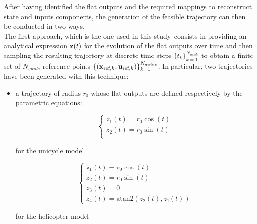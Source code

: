 \documentclass[../main.tex]{subfiles}
\begin{document}
After having identified the flat outputs and the required mappings to
reconstruct state and inputs components, the
generation of the feasible trajectory can then be conducted in two ways.\\

\pagebreak
The first approach, which is the one used in this study, consists in providing
an analytical expression $\mathbf{z}(t)$ for the evolution of the flat outputs over time and
then sampling  the resulting trajectory at discrete time steps
$\{t_k\}_{k=1}^{N_{guide}}$	to obtain a finite set of $N_{guide}$ reference
points $\{(\mathbf{x}_{\text{ref}, k}, \mathbf{u}_{\text{ref}, k})\}_{k=1}^{N_{guide}}$.
In particular, two trajectories have been generated with this technique:
\begin{itemize}
	
	\item a  trajectory of radius $r_0$ whose flat
		outputs are defined respectively by the parametric equations:
		\vspace{-0.5cm}
		\begin{multicols}{2}
			\begin{equation*}
				\begin{cases}
					z_1(t) = r_0 \cos(t)\\
					z_2(t) = r_0 \sin(t)\\
				\end{cases}
			\end{equation*}
			\begin{center}
				for the unicycle model\\
			\end{center}
		\columnbreak
			\begin{equation*}
				\begin{cases}
					z_1(t) = r_0 \cos(t)\\
					z_2(t) = r_0 \sin(t)\\
					z_3(t) = 0\\
					z_4(t) = \text{atan2}\left(\dot{z}_2(t), \dot{z}_1(t)\right)
				\end{cases}
			\end{equation*}
			\begin{center}
				for the helicopter model
			\end{center}
		\end{multicols}


\end{itemize}
\end{document}
